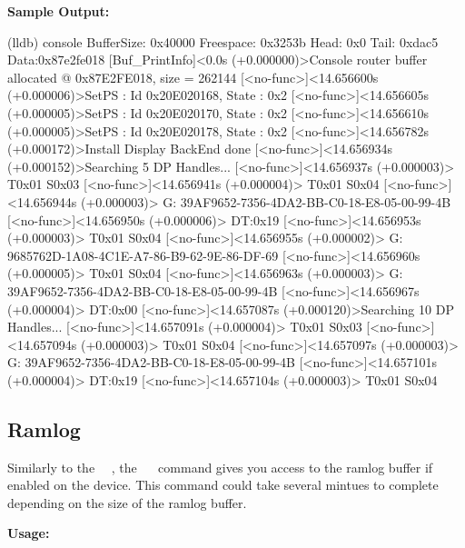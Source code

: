 \textcolor{SmokeyDarkBlue}{\bfseries Sample Output:} \\
\begin{TerminalOutput}
(lldb) console
BufferSize: 0x40000
Freespace: 0x3253b
Head: 0x0
Tail: 0xdac5
Data:0x87e2fe018
[Buf_PrintInfo]<0.0s (+0.000000)>Console router buffer allocated @ 0x87E2FE018, size = 262144
 [<no-func>]<14.656600s (+0.000006)>SetPS : Id 0x20E020168, State : 0x2
 [<no-func>]<14.656605s (+0.000005)>SetPS : Id 0x20E020170, State : 0x2
 [<no-func>]<14.656610s (+0.000005)>SetPS : Id 0x20E020178, State : 0x2
 [<no-func>]<14.656782s (+0.000172)>Install Display BackEnd done
 [<no-func>]<14.656934s (+0.000152)>Searching 5 DP Handles...
 [<no-func>]<14.656937s (+0.000003)>  T0x01 S0x03
 [<no-func>]<14.656941s (+0.000004)>  T0x01 S0x04
 [<no-func>]<14.656944s (+0.000003)>    G: 39AF9652-7356-4DA2-BB-C0-18-E8-05-00-99-4B
 [<no-func>]<14.656950s (+0.000006)>      DT:0x19
 [<no-func>]<14.656953s (+0.000003)>  T0x01 S0x04
 [<no-func>]<14.656955s (+0.000002)>    G: 9685762D-1A08-4C1E-A7-86-B9-62-9E-86-DF-69
 [<no-func>]<14.656960s (+0.000005)>  T0x01 S0x04
 [<no-func>]<14.656963s (+0.000003)>    G: 39AF9652-7356-4DA2-BB-C0-18-E8-05-00-99-4B
 [<no-func>]<14.656967s (+0.000004)>      DT:0x00
 [<no-func>]<14.657087s (+0.000120)>Searching 10 DP Handles...
 [<no-func>]<14.657091s (+0.000004)>  T0x01 S0x03
 [<no-func>]<14.657094s (+0.000003)>  T0x01 S0x04
 [<no-func>]<14.657097s (+0.000003)>    G: 39AF9652-7356-4DA2-BB-C0-18-E8-05-00-99-4B
 [<no-func>]<14.657101s (+0.000004)>      DT:0x19
 [<no-func>]<14.657104s (+0.000003)>  T0x01 S0x04
\end{TerminalOutput}

\subsection{Ramlog}

Similarly to the ~~, the ~~ command gives you access to the
ramlog buffer if enabled on the device. This command could take several mintues to complete
depending on the size of the ramlog buffer.

\textcolor{SmokeyDarkBlue}{\bfseries Usage:} 

